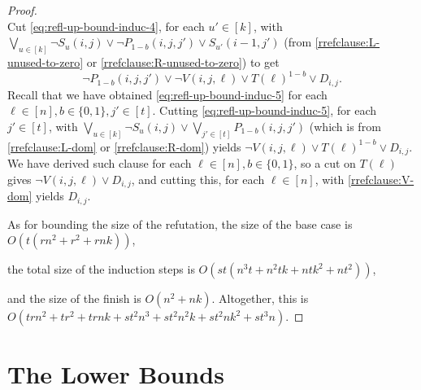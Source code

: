 \begin{proof}
\begin{equation}
\end{equation}
Cut \eqref{eq:refl-up-bound-induc-4}, for each $u' \in [k]$, with $\bigvee_{u \in [k]} \neg S_u(i,j) \lor \neg P_{1-b}(i,j,j') \lor S_{u'}(i-1,j')$ (from \eqref{rrefclause:L-unused-to-zero} or \eqref{rrefclause:R-unused-to-zero}) to get
\begin{equation}
\label{eq:refl-up-bound-induc-5}
 \neg P_{1-b}(i,j,j') \lor \neg V(i,j,\ell) \lor T(\ell)^{1-b} \lor D_{i,j}.
\end{equation}
Recall that we have obtained \eqref{eq:refl-up-bound-induc-5} for each $\ell \in [n], b \in \{0,1\}, j' \in [t]$. Cutting \eqref{eq:refl-up-bound-induc-5}, for each $j' \in [t]$, 
with $\bigvee_{u \in [k]} \neg S_u(i,j) \lor \bigvee_{j' \in [t]} P_{1-b}(i,j,j')$ (which is from \eqref{rrefclause:L-dom} or \eqref{rrefclause:R-dom}) yields $\neg V(i,j,\ell) \lor T(\ell)^{1-b} \lor D_{i,j}$. We have derived such clause for each $\ell \in [n], b \in \{0,1\}$, so a cut on $T(\ell)$ gives $\neg V(i,j,\ell) \lor D_{i,j}$, and cutting this, for each $\ell \in [n]$, with \eqref{rrefclause:V-dom} yields $D_{i,j}$.

As for bounding the size of the refutation, the size of the base case is $O(t(rn^2 + r^2 + rnk))$,

the total size of the induction steps is $O(st(n^3t + n^2tk + ntk^2 + nt^2 ))$, 

and the size of the finish is $O(n^2 + nk)$. Altogether, this is $O(trn^2 + tr^2 + trnk + st^2n^3 + st^2n^2k + st^2nk^2 + st^3n)$.
\end{proof}



\section{The Lower Bounds}
\label{sec:res2-no-wfdp}

